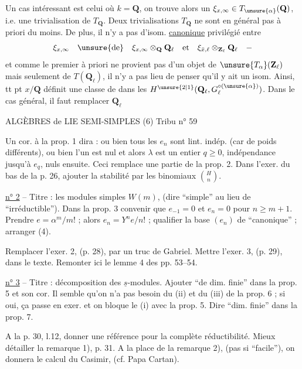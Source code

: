 Un cas intéressant est celui où $k=\mathbf Q$, on trouve alors un  $\xi_{x,\infty}\in T_{\unsure{\alpha}}(\mathbf Q)$, i.e. une trivialisation de $T_{\mathbf Q}$. Deux trivialisations  $T_{\mathbf Q}$ ne sont en général pas  à priori du moins. De plus, il n'y a pas d'isom. \uline{canonique} privilégié entre
\[
\xi_{x,\infty}\quad\unsure{\text{de}}\quad\xi_{x,\infty}\otimes_{\mathbf Q}\mathbf Q_\ell
\quad\text{et}\quad\xi_{\bar x,\ell}\otimes_{\mathbf Z_\ell}\mathbf Q_\ell\quad-
\]
 et comme le premier à priori ne provient pas d'un objet de $\unsure{T_{\alpha}}(\mathbf Z_\ell)$ mais seulement de $T(\mathbf Q_\ell)$, il n'y a pas lieu de penser qu'il y ait  un isom. Ainsi, tt pt $x/\mathbf Q$ définit une classe de  dans les $H^{\unsure{2|1}}(\mathbf Q_\ell,G_\ell^{\circ(\unsure{\alpha})})$. Dans le cas général, il faut remplacer $\mathbf Q_\ell$

ALGÈBRES de LIE SEMI-SIMPLES (6) \hfill Tribu n° 59

Un cor. à la prop. 1 dira : ou bien tous les $e_n$ sont lint. indép. (car de poids différents), ou bien l'un est nul et alors $\lambda$ est un entier $q\geq 0$, indépendance jusqu'à $e_q$, nuls ensuite. Ceci remplace une partie de la prop. 2. Dans l'exer. du bas de la p. 26, ajouter la stabilité par les binomiaux $\binom Hn$.

\uline{n° 2} -- Titre : les modules simples $W(m)$, (dire ``simple'' au lieu de ``irréductible''). Dans la prop. 3 convenir que $e_{-1}=0$ et $e_n=0$ pour $n\geq m+1$. Prendre $e=\alpha^m/m!$ ; alors $e_n=Y^ne/n!$ ; qualifier la base $(e_n)$ de ``canonique'' ; arranger (4).

Remplacer l'exer. 2, (p. 28), par un truc de Gabriel. Mettre l'exer. 3, (p. 29), dans le texte. Remonter ici le lemme 4 des pp. 53--54.

\uline{n° 3} -- Titre : décomposition des $\underline s$-modules. Ajouter ``de dim. finie'' dans la prop. 5 et son cor. Il semble qu'on n'a pas besoin du (ii) et du (iii) de la prop. 6 ; si oui, ça passe en exer. et on bloque le (i) avec la prop. 5. Dire ``dim. finie'' dans la prop. 7.

A la p. 30, l.12, donner une référence pour la complète réductibilité. Mieux détailler la remarque 1), p. 31. A la place de la remarque 2), (pas si ``facile''), on donnera le calcul du Casimir, (cf. Papa Cartan).

